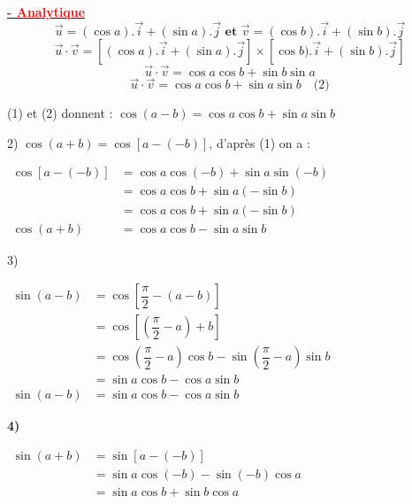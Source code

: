 \documentclass[a4paper,12pt]{article}
\begin{document}
\vspace{1em}
\underline{\textbf{\textcolor{red}{- Analytique}}} \\
\[
\vec{u} = (\cos a) .\vec{i} + (\sin a) .\vec{j} \textbf{ et } \vec{v} = (\cos b) .\vec{i} + (\sin b) .\vec{j}
\]
\[
\vec{u} \cdot \vec{v} = \left[(\cos a) .\vec{i} + (\sin a) .\vec{j}\right] \times \left[\cos b) .\vec{i} + (\sin b) .\vec{j}\right]
\]
\[
\vec{u} \cdot \vec{v} = \cos a \cos b + \sin b \sin a
\]
\[
\vec{u} \cdot \vec{v} = \cos a \cos b + \sin a \sin b \quad \text{(2)}
\]

(1) et (2) donnent : \(\cos(a - b) = \cos a \cos b + \sin a \sin b\)

\vspace{1em}
2) \( \cos(a + b) = \cos[a - (-b)] \), d’après (1) on a :

\(
\begin{aligned}
    \cos[a - (-b)] &= \cos a \cos(-b) + \sin a \sin(-b)\\
    &= \cos a \cos b + \sin a (-\sin b)\\
    &= \cos a \cos b + \sin a (-\sin b)\\
    \cos(a + b) &= \cos a \cos b - \sin a \sin b
\end{aligned}
\)

\vspace{1em}
3)

\(
\begin{aligned}
    \sin(a - b) &= \cos\left[ \dfrac{\pi}{2} - (a - b) \right]\\
                &= \cos\left[ \left( \dfrac{\pi}{2} - a \right) + b \right]\\
                &= \cos\left( \dfrac{\pi}{2} - a \right)\cos b - \sin\left( \dfrac{\pi}{2} - a \right)\sin b\\
                &= \sin a \cos b - \cos a \sin b\\
    \sin(a - b) &= \sin a \cos b - \cos a \sin b
\end{aligned}
\)

\textbf{4) }

\(
\begin{aligned}
    \sin(a + b) &= \sin[a - (-b)]\\
                &= \sin a \cos (-b) - \sin (-b) \cos a\\
                &= \sin a \cos b + \sin b \cos a\\
\end{aligned}
\)
\end{document}
